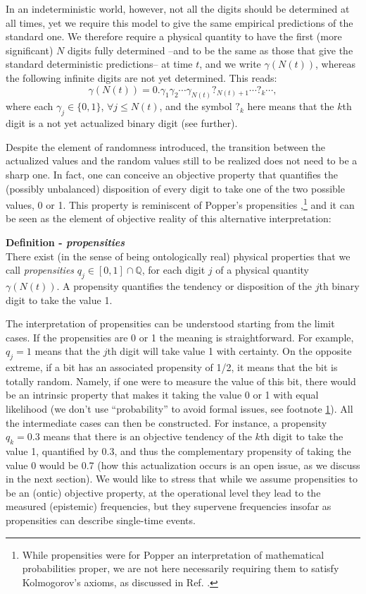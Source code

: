 \documentclass[aps,prl,twocolumn,showpacs,superscriptaddress,groupedaddress, nofootinbib]{revtex4-1}
\newcommand{\Q}{\mathbb{Q}}
\begin{document}
In an indeterministic world, however, not all the digits should be determined at all times, yet we require this model to give the same empirical predictions of the standard one. We therefore require a physical quantity to have the first (more significant) $N$ digits fully determined --and to be the same as those that give the standard deterministic predictions-- at time $t$, and we write $\gamma(N(t))$, whereas the following infinite digits are not yet determined. This reads:
%
\begin{equation*}
\gamma \left(N(t)\right)=0.\gamma_1\gamma_2\cdots \gamma_{N(t)} ?_{N(t)+1}\cdots ?_k\cdots,
\end{equation*}
%
where each $\gamma_j\in\{0,1\}$, $\forall j\leq N(t)$, and the symbol $?_k$ here means that the $k$th digit is a not yet actualized binary digit (see further).

Despite the element of randomness introduced, the transition between the actualized values and the random values still to be realized does not need to be a sharp one. In fact, one can conceive an objective property that quantifies the (possibly unbalanced) disposition of every digit to take one of the two possible values, 0 or 1. This property is reminiscent of Popper's propensities \cite{popper},\footnote{\label{note}While propensities were for Popper an interpretation of mathematical probabilities proper, we are not here necessarily requiring them to satisfy Kolmogorov's axioms, as discussed in Ref. \cite{gisin2}.} and it can be seen as the element of objective reality of this alternative interpretation:


\textbf{Definition - \textit{propensities}}\\
There exist (in the sense of  being ontologically real) physical properties that we call \emph{propensities} $q_j\in [0,1] \cap \Q$, for each digit $j$ of a physical quantity $\gamma(N(t))$. A propensity quantifies the tendency or disposition of the $j$th binary digit to take the value 1.

{The interpretation of propensities can be understood starting from the limit cases. If the propensities are 0 or 1 the meaning is straightforward. For example, $q_j=1$ means that the $j$th digit will take value 1 with certainty. On the opposite extreme, if a bit has an associated propensity of 1/2, it means that the bit is totally random. Namely, if one were to measure the value of this bit, there would be an intrinsic property that makes it taking the value 0 or 1 with equal likelihood (we don't use ``probability'' to avoid formal issues, see footnote \ref{note}). All the intermediate cases can then be constructed. For instance, a propensity $q_k=0.3$ means that there is an objective tendency of the $k$th digit to take the value 1, quantified by 0.3, and thus the complementary propensity of taking the value 0 would be 0.7 (how this actualization occurs is an open issue, as we discuss in the next section). We would like to stress that while we assume propensities to be an (ontic) objective property, at the operational level they lead to the measured (epistemic) frequencies, but they supervene frequencies insofar as propensities can describe single-time events.}
\end{document}
